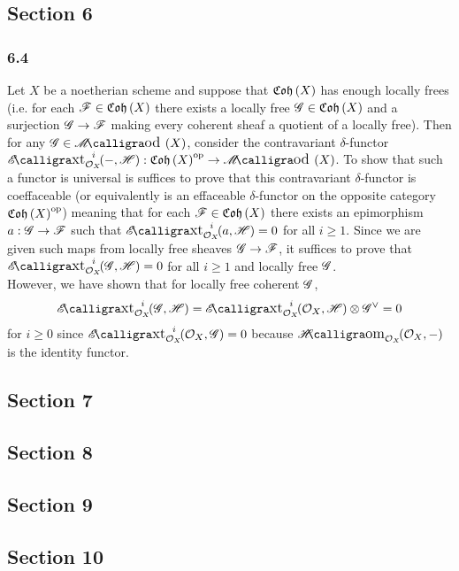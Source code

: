 \documentclass[12pt]{article}
\begin{document}
\subsection{Section 6}

\subsubsection{6.4}

Let $X$ be a noetherian scheme and suppose that $\mathfrak{Coh}\left(X\right)$ has enough locally frees (i.e. for each $\mathscr{F} \in \mathfrak{Coh}\left(X\right)$ there exists a locally free $\mathscr{G} \in \mathfrak{Coh}\left(X\right)$ and a surjection $\mathscr{G} \to \mathscr{F}$ making every coherent sheaf a quotient of a locally free). Then for any $\G \in \shMod{X}$, consider the contravariant $\delta$-functor $\shExt{i}{\struct{X}}{-}{\H} : \Coh{X}^{\op} \to \shMod{X}$. To show that such a functor is universal is suffices to prove that this contravariant $\delta$-functor is coeffaceable (or equivalently is an effaceable $\delta$-functor on the opposite category $\mathfrak{Coh}\left(X\right)^{\mathrm{op}}$) meaning that for each $\mathscr{F} \in \mathfrak{Coh}\left(X\right)$ there exists an epimorphism $a : \mathscr{G} \to \mathscr{F}$ such that $\shExt{i}{\struct{X}}{a}{\H} = 0$ for all $i \ge 1$. Since we are given such maps from locally free sheaves $\mathscr{G} \to \mathscr{F}$, it suffices to prove that $\shExt{i}{\struct{X}}{\G}{\H} = 0$ for all $i \ge 1$ and locally free $\mathscr{G}$. 
\bigskip\\
However, we have shown that for locally free coherent $\mathscr{G}$,
\[ \shExt{i}{\struct{X}}{\G}{\H} = \shExt{i}{\struct{X}}{\struct{X}}{\H} \otimes \G^\vee = 0 \]
for $i \ge 0$ since $\shExt{i}{\struct{X}}{\struct{X}}{\G} = 0$ because $\shHomover{\struct{X}}{\struct{X}}{-}$ is the identity functor. 

\subsection{Section 7}

\subsection{Section 8}

\subsection{Section 9}

\subsection{Section 10}
\end{document}
